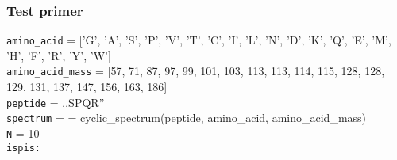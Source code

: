 

\subsubsection{Test primer}

\noindent\texttt{amino\_acid} = ['G', 'A', 'S', 'P', 'V', 'T', 'C', 'I', 'L', 'N', 'D', 'K', 'Q', 'E', 'M', 'H', 'F', 'R', 'Y', 'W']
\\
\texttt{amino\_acid\_mass} = [57, 71, 87, 97, 99, 101, 103, 113, 113, 114, 115, 128, 128, 129, 131, 137, 147, 156, 163, 186]
\\\texttt{peptide} = ‚‚SPQR''
\\\texttt{spectrum} =  = cyclic\_spectrum(peptide, amino\_acid, amino\_acid\_mass)
\\\texttt{N} = 10
\\\texttt{ispis:} 
 